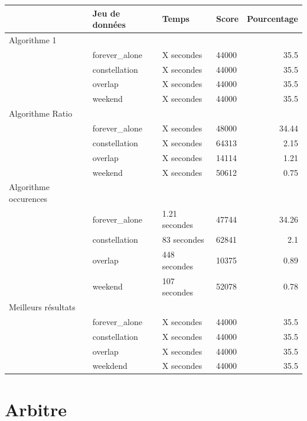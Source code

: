 \documentclass[11pt]{article}
\begin{document}
			\footnotesize
		\hspace*{-1cm}\noindent\begin{tabularx}{16cm}{|l|p{4cm}|X|p{2cm}|r|}
			\hline
			 & \textbf{Jeu de données} & \textbf{Temps} & \textbf{Score} & \textbf{Pourcentage} \\
			\hline
		    \cellcolor{blue!25} Algorithme 1 & & & & \\
		    \cellcolor{blue!25} & forever\_alone & X secondes & 44000 & 35.5 \\
		    \cellcolor{blue!25} & constellation & X secondes & 44000 & 35.5 \\
		    \cellcolor{blue!25} & overlap & X secondes & 44000 & 35.5 \\
		    \cellcolor{blue!25} & weekend & X secondes & 44000 & 35.5 \\
		    \hline
				\cellcolor{yellow!25} Algorithme Ratio & & & & \\
		    \cellcolor{yellow!25} & forever\_alone & X secondes & 48000 & 34.44 \\
		    \cellcolor{yellow!25} & constellation & X secondes & 64313 & 2.15 \\
		    \cellcolor{yellow!25} & overlap & X secondes & 14114 & 1.21 \\
		    \cellcolor{yellow!25} & weekend & X secondes & 50612 & 0.75 \\
				\hline
			\cellcolor{green!25} Algorithme occurences & & & & \\
		    \cellcolor{green!25} & forever\_alone & 1.21 secondes & 47744 & 34.26 \\
		    \cellcolor{green!25} & constellation & 83 secondes & 62841 & 2.1 \\
		    \cellcolor{green!25} & overlap & 448 secondes & 10375 & 0.89 \\
		    \cellcolor{green!25} & weekend & 107 secondes & 52078 & 0.78 \\
				\hline
		    \cellcolor{red!25} Meilleurs résultats & & & & \\
		    \cellcolor{red!25} & forever\_alone & X secondes & 44000 & 35.5 \\
		    \cellcolor{red!25} & constellation & X secondes & 44000 & 35.5 \\
		    \cellcolor{red!25} & overlap & X secondes & 44000 & 35.5 \\
		    \cellcolor{red!25} & weekdend & X secondes & 44000 & 35.5 \\
		    \hline
		\end{tabularx}
		\normalsize

	\section{Arbitre} %
	\label{sec:arbitre}
	
	
	

\end{document}
